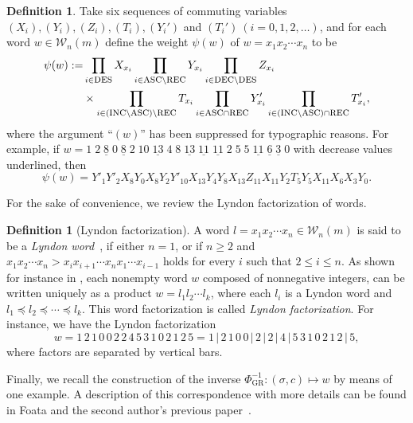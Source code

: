 \documentclass[12pt]{amsart}
\numberwithin{equation}{section}
\theoremstyle{plain}
\theoremstyle{definition}
\newtheorem{Def}[theorem]{Definition}
\def\DES{\hbox{\rm\textsc{des}}}
\def\DEC{\hbox{\rm\textsc{dec}}}
\def\INC{\hbox{\rm\textsc{inc}}}
\def\REC{\hbox{\rm\textsc{rec}}}
\def\W{\mathcal{W}}
\def\ASC{\hbox{\rm\textsc{asc}}}
\def\U{\underline}
\begin{document}
\begin{Def}\label{weight:psi}
Take six sequences of commuting variables $(X_i), (Y_i), (Z_i), (T_i), (Y_i')$ and $(T_i')~(i=0,1,2,\ldots)$, and for each word $w\in\W_n(m)$ define the weight $\psi(w)$ of $w=x_1x_2\cdots x_n$ to be
\begin{align}
\psi(w):=& \prod_{i\in\DES}X_{x_i}\prod_{i\in\ASC\backslash\REC}Y_{x_i}\prod_{i\in\DEC\backslash\DES}Z_{x_i}\\
&\times\prod_{i\in(\INC\backslash\ASC)\backslash\REC}T_{x_i}\prod_{i\in\ASC\cap\REC}Y_{x_i}'\prod_{i\in(\INC\backslash\ASC)\cap\REC}T_{x_i}',\nonumber
\end{align}
where the argument ``$(w)$'' has been suppressed for typographic reasons. For example, if $w=1\;2\;\U{8}\;0\;\U{8}\;2\;10\; \U{13}\;4\;8\; \U{13}\;\U{11}\;\U{11}\;2\;5\;5\; \U{11}\;\U{6}\; \U{3}\;0$ with decrease values underlined, then 
\begin{equation}\label{exm:psi}
\psi(w)=Y'_1Y'_2X_8Y_0X_8Y_2Y'_{10}X_{13}Y_4Y_8X_{13}Z_{11}X_{11}Y_2T_5Y_5X_{11}X_6X_3Y_0.
\end{equation}
\end{Def}

For the sake of convenience, we review the Lyndon factorization of words.
\begin{Def}[Lyndon factorization]
A word $l=x_1x_2\cdots x_n\in\W_n(m)$ is said to be a {\em Lyndon word}~\cite{fh3,lo}, if either $n=1$, or if $n\ge 2$ and $x_1x_2\cdots x_n>x_ix_{i+1}\cdots x_nx_1\cdots x_{i-1}$ holds for every $i$ such that $2\le i\le n$. As shown for instance in \cite[Theorem~5.1.5]{lo}, each nonempty word $w$ composed of nonnegative integers, can be written uniquely as a product $w=l_1l_2\cdots l_k$, where each $l_i$ is a Lyndon word and $l_1\preceq l_2\preceq \cdots\preceq l_k$. This word factorization is called  {\em Lyndon factorization}. For instance, we have the Lyndon factorization 
$$
w=1\,2\,1\,0\,0\,2\,2\,4\,5\,3\,1\,0\,2\,1\,2\,5=1\,|\,2\,1\,0\,0\,|\,2\,|\,2\,|\,4\,|\,5\,3\,1\,0\,2\,1\,2\,|\,5,
$$
where factors are separated by vertical bars. 
\end{Def}
Finally, we recall the construction of the inverse $\Phi_{\mathrm{GR}}^{-1}:(\sigma,c)\mapsto w$ by means of one example. A description of this correspondence with more details can be found in Foata and the second author's previous paper~\cite{fh3}.
\end{document}
